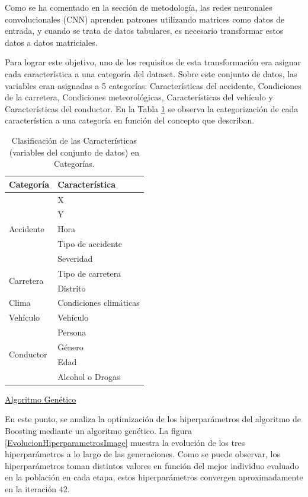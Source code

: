 \documentclass{uathesis-es}
\begin{document}
Como se ha comentado en la sección de metodología, las redes neuronales convolucionales (CNN) aprenden patrones utilizando matrices como datos de entrada, y cuando se trata de datos tabulares, es necesario transformar estos datos a datos matriciales.

Para lograr este objetivo, uno de los requisitos de esta transformación era asignar cada característica a una categoría del dataset. Sobre este conjunto de datos, las variables eran asignadas a 5 categorías: Características del accidente, Condiciones de la carretera, Condiciones meteorológicas, Características del vehículo y Características del conductor. En la Tabla \ref{JC} se observa la categorización de cada característica a una categoría en función del concepto que describan.

\begin{table}[H]
	\centering

		\begin{tabular}{ |l|l| }
			\hline
			\textbf{Categoría} & \textbf{Característica} \\
			\hline
			\hline
			\multirow{5}{*}{Accidente} & X \\
									   & Y \\
									   & Hora \\
									   & Tipo de accidente \\
									   & Severidad \\
			\hline
			\multirow{2}{*}{Carretera} & Tipo de carretera \\
									   & Distrito \\
			\hline
			Clima & Condiciones climáticas \\
			\hline
			Vehículo & Vehículo \\
			\hline
			\multirow{4}{*}{Conductor} & Persona \\
									   & Género \\
									   & Edad \\
									   & Alcohol o Drogas \\
			\hline
		\end{tabular}

	\caption{Clasificación de las Características (variables del conjunto de datos) en Categorías.}
	\label{JC}
\end{table}


\underline{Algoritmo Genético}

En este punto, se analiza la optimización de los hiperparámetros del algoritmo de Boosting mediante un algoritmo genético. La figura \ref{EvolucionHiperparametrosImage} muestra la evolución de  los tres hiperparámetros a lo largo de las generaciones. Como se puede observar, los hiperparámetros toman distintos valores en función del mejor individuo evaluado en la población en cada etapa, estos hiperparámetros convergen aproximadamente en la iteración $42$.
\end{document}
